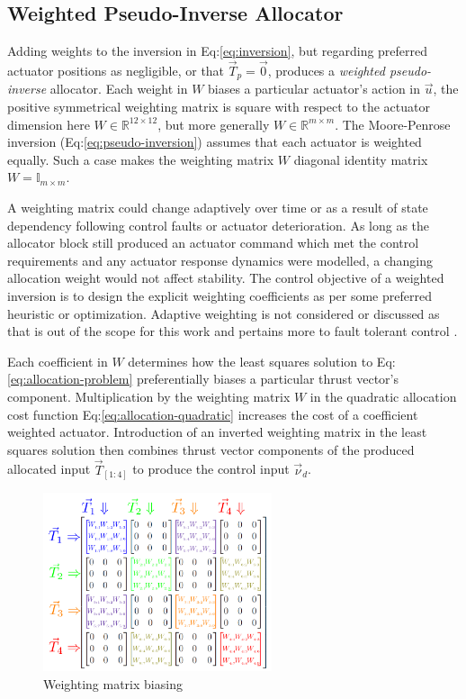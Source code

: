 \subsection{Weighted Pseudo-Inverse Allocator}
\label{subsec:allocation.allocators.weightedinverse}
Adding weights to the inversion in Eq:\ref{eq:inversion}, but regarding preferred actuator positions as negligible, or that $\vec{T}_p=\vec{0}$, produces a \emph{weighted pseudo-inverse} allocator. Each weight in $W$ biases a particular actuator's action in $\vec{u}$, the positive symmetrical weighting matrix is square with respect to the actuator dimension here $W\in\mathbb{R}^{12\times 12}$, but more generally $W\in\mathbb{R}^{m\times m}$. The Moore-Penrose inversion (Eq:\ref{eq:pseudo-inversion}) assumes that each actuator is weighted equally. Such a case makes the weighting matrix $W$ diagonal identity matrix $W = \mathbb{I}_{m\times m}$. 
\par
A weighting matrix could change adaptively over time or as a result of state dependency following control faults or actuator deterioration. As long as the allocator block still produced an actuator command which met the control requirements and any actuator response dynamics were modelled, a changing allocation weight would not affect stability. The control objective of a weighted inversion is to design the explicit weighting coefficients as per some preferred heuristic or optimization. Adaptive weighting is not considered or discussed as that is out of the scope for this work and pertains more to fault tolerant control \cite{FTCallocation}.
\par
Each coefficient in $W$ determines how the least squares solution to Eq:\ref{eq:allocation-problem} preferentially biases a particular thrust vector's component. Multiplication by the weighting matrix $W$ in the quadratic allocation cost function Eq:\ref{eq:allocation-quadratic} increases the cost of a coefficient weighted actuator. Introduction of an inverted weighting matrix in the least squares solution then combines thrust vector components of the produced allocated input $\vec{T}_{[1:4]}$ to produce the control input $\vec{\nu}_d$. 
\begin{figure}[htbp]
\vspace{-6pt}
\centering
\includegraphics[width=0.6\textwidth]{figs/weighted-matrix}
\vspace{-6pt}
\caption{Weighting matrix biasing}
\label{fig:weighted-matrix-allocation}
\vspace{-6pt}
\end{figure}
